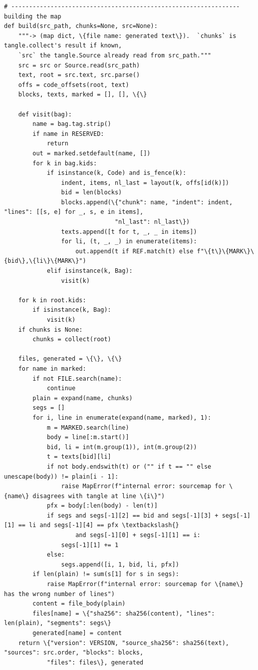 \documentclass[10pt,a4paper]{article}
\newcounter{chunk}
\begin{document}
\begin{Verbatim}
# ---------------------------------------------------------------- building the map
def build(src_path, chunks=None, src=None):
    """-> (map dict, \{file name: generated text\}).  `chunks` is tangle.collect's result if known,
    `src` the tangle.Source already read from src_path."""
    src = src or Source.read(src_path)
    text, root = src.text, src.parse()
    offs = code_offsets(root, text)
    blocks, texts, marked = [], [], \{\}

    def visit(bag):
        name = bag.tag.strip()
        if name in RESERVED:
            return
        out = marked.setdefault(name, [])
        for k in bag.kids:
            if isinstance(k, Code) and is_fence(k):
                indent, items, nl_last = layout(k, offs[id(k)])
                bid = len(blocks)
                blocks.append(\{"chunk": name, "indent": indent, "lines": [[s, e] for _, s, e in items],
                               "nl_last": nl_last\})
                texts.append([t for t, _, _ in items])
                for li, (t, _, _) in enumerate(items):
                    out.append(t if REF.match(t) else f"\{t\}\{MARK\}\{bid\},\{li\}\{MARK\}")
            elif isinstance(k, Bag):
                visit(k)

    for k in root.kids:
        if isinstance(k, Bag):
            visit(k)
    if chunks is None:
        chunks = collect(root)

    files, generated = \{\}, \{\}
    for name in marked:
        if not FILE.search(name):
            continue
        plain = expand(name, chunks)
        segs = []
        for i, line in enumerate(expand(name, marked), 1):
            m = MARKED.search(line)
            body = line[:m.start()]
            bid, li = int(m.group(1)), int(m.group(2))
            t = texts[bid][li]
            if not body.endswith(t) or ("" if t == "" else unescape(body)) != plain[i - 1]:
                raise MapError(f"internal error: sourcemap for \{name\} disagrees with tangle at line \{i\}")
            pfx = body[:len(body) - len(t)]
            if segs and segs[-1][2] == bid and segs[-1][3] + segs[-1][1] == li and segs[-1][4] == pfx \textbackslash{}
                    and segs[-1][0] + segs[-1][1] == i:
                segs[-1][1] += 1
            else:
                segs.append([i, 1, bid, li, pfx])
        if len(plain) != sum(s[1] for s in segs):
            raise MapError(f"internal error: sourcemap for \{name\} has the wrong number of lines")
        content = file_body(plain)
        files[name] = \{"sha256": sha256(content), "lines": len(plain), "segments": segs\}
        generated[name] = content
    return \{"version": VERSION, "source_sha256": sha256(text), "sources": src.order, "blocks": blocks,
            "files": files\}, generated
\end{Verbatim}
\end{document}
